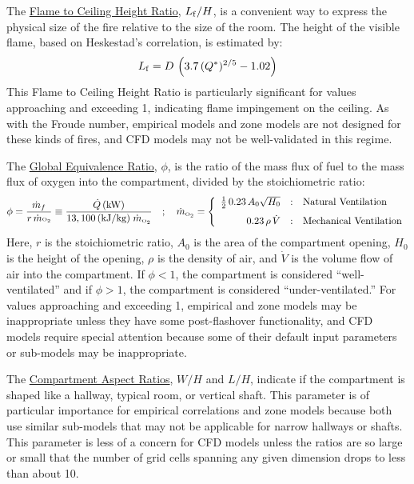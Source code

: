 \documentclass[fleqn,b5paper]{article}
\begin{document}
The \underline{Flame to Ceiling Height Ratio}, $L_{\rm f}/H$, is a convenient way to express the physical size of the fire relative to the size of the room. The height of the visible flame, based on Heskestad's correlation, is estimated by:
\begin{equation} 
   L_{\rm f} = D \, \left( 3.7 \, (Q^*)^{2/5} - 1.02 \right) 
\end{equation}
This Flame to Ceiling Height Ratio is particularly significant for values approaching and exceeding 1, indicating flame impingement on the ceiling. As with the Froude number, empirical models and zone models are not designed for these kinds of fires, and CFD models may not be well-validated in this regime.

The \underline{Global Equivalence Ratio}, $\phi$, is the ratio of the mass flux of fuel to the mass flux of oxygen into the compartment, divided by the stoichiometric ratio:
\begin{equation} \phi = \frac{\dot{m}_f}{r\, \dot{m}{\hbox{\tiny O$_2$}}} \equiv  \frac{\dot{Q} \, \hbox{(kW)}}{13,100 \, \hbox{(kJ/kg)} \; \dot{m}_{\hbox{\tiny O$_2$}} } \quad ; \quad  \dot{m}_{\hbox{\tiny O$_2$}} = \left\{
   \begin{array}{r@{\quad:\quad}l}
      \frac{1}{2} \, 0.23 \, A_0 \sqrt{H_0} & \hbox{Natural Ventilation} \\[0.1in]
      0.23 \, \rho \, \dot{V}       & \hbox{Mechanical Ventilation} \end{array} \right.
\end{equation}
Here, $r$ is the stoichiometric ratio, $A_0$ is the area of the compartment opening, $H_0$ is the height of the opening, $\rho$ is the density of air, and $\dot{V}$ is the volume flow of air into the compartment. If $\phi<1$, the compartment is considered ``well-ventilated'' and if $\phi>1$, the compartment is considered ``under-ventilated.'' For values approaching and exceeding 1, empirical and zone models may be inappropriate unless they have some post-flashover functionality, and CFD models require special attention because some of their default input parameters or sub-models may be inappropriate.

The \underline{Compartment Aspect Ratios}, $W/H$ and $L/H$, indicate if the compartment is shaped like a hallway, typical room, or vertical shaft. This parameter is of particular importance for empirical correlations and zone models because both use similar sub-models that may not be applicable for narrow hallways or shafts. This parameter is less of a concern for CFD models unless the ratios are so large or small that the number of grid cells spanning any given dimension drops to less than about 10.
\end{document}
